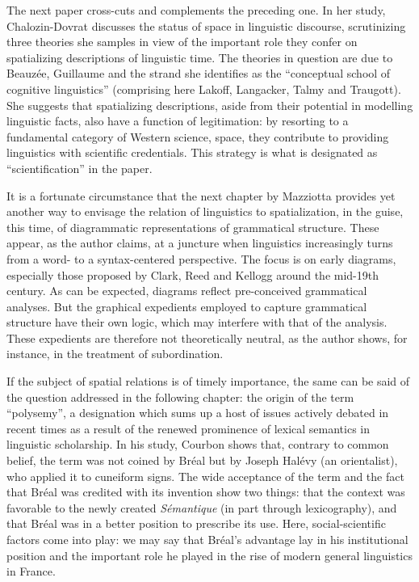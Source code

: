 \documentclass[output=paper]{langsci/langscibook}
\begin{document}
The next paper cross-cuts and complements the preceding one. In her study, Chalozin-Dovrat discusses the status of space in linguistic discourse, scrutinizing three theories she samples in view of the important role they confer on spatializing descriptions of linguistic time. The theories in question are due to Beauzée, Guillaume and the strand she identifies as the ``conceptual school of cognitive linguistics'' (comprising here Lakoff, Langacker, Talmy and Traugott). She suggests that spatializing descriptions, aside from their potential in modelling linguistic facts, also have a function of legitimation: by resorting to a fundamental category of Western science, space, they contribute to providing linguistics with scientific credentials. This strategy is what is designated as ``scientification'' in the paper.

It is a fortunate circumstance that the next chapter by Mazziotta provides yet another way to envisage the relation of linguistics to spatialization, in the guise, this time, of diagrammatic representations of grammatical structure. These appear, as the author claims, at a juncture when linguistics increasingly turns from a word- to a syntax-centered perspective. The focus is on early diagrams, especially those proposed by Clark, Reed and Kellogg around the mid-19th century. As can be expected, diagrams reflect pre-conceived grammatical analyses. But the graphical expedients employed to capture grammatical structure have their own logic, which may interfere with that of the analysis. These expedients are therefore not theoretically neutral, as the author shows, for instance, in the treatment of subordination.

If the subject of spatial relations is of timely importance, the same can be said of the question addressed in the following chapter: the origin of the term ``polysemy'', a designation which sums up a host of issues actively debated in recent times as a result of the renewed prominence of lexical semantics in linguistic scholarship. In his study, Courbon shows that, contrary to common belief, the term was not coined by Bréal but by Joseph Halévy (an orientalist), who applied it to cuneiform signs. The wide acceptance of the term and the fact that Bréal was credited with its invention show two things: that the context was favorable to the newly created \emph{Sémantique} (in part through lexicography), and that Bréal was in a better position to prescribe its use. Here, social-scientific factors come into play: we may say that Bréal’s advantage lay in his institutional position and the important role he played in the rise of modern general linguistics in France.
\end{document}
